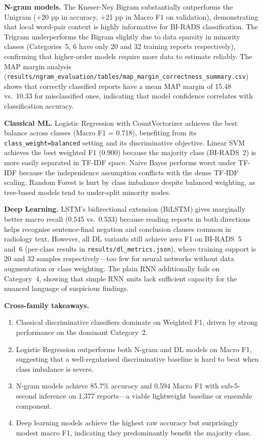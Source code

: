 \documentclass[11pt,a4paper]{article}
\begin{document}
\textbf{N-gram models.}
The Kneser-Ney Bigram substantially outperforms the Unigram ($+$20 pp in
accuracy, $+$21 pp in Macro F1 on validation), demonstrating that local
word-pair context is highly informative for BI-RADS classification.
The Trigram underperforms the Bigram slightly due to data sparsity in minority
classes (Categories~5, 6 have only 20 and 32 training reports respectively),
confirming that higher-order models require more data to estimate reliably.
The MAP margin analysis (\texttt{results/ngram\_evaluation/tables/map\_margin\_correctness\_summary.csv})
shows that correctly classified reports have a mean MAP margin of 15.48
vs.\ 10.33 for misclassified ones, indicating that model confidence correlates
with classification accuracy.

\textbf{Classical ML.}
Logistic Regression with CountVectorizer achieves the best balance across
classes (Macro F1 = 0.718), benefiting from its \texttt{class\_weight=balanced}
setting and its discriminative objective.
Linear SVM achieves the best weighted F1 (0.900) because the majority class
(BI-RADS~2) is more easily separated in TF-IDF space.
Naive Bayes performs worst under TF-IDF because the independence assumption
conflicts with the dense TF-IDF scaling.
Random Forest is hurt by class imbalance despite balanced weighting, as
tree-based models tend to under-split minority nodes.

\textbf{Deep Learning.}
LSTM's bidirectional extension (BiLSTM) gives marginally better macro recall
(0.545 vs.\ 0.533) because reading reports in both directions helps recognise
sentence-final negation and conclusion clauses common in radiology text.
However, all DL variants still achieve zero F1 on BI-RADS~5 and~6 (per-class
results in \texttt{results/dl\_metrics.json}), where training support is 20
and 32 samples respectively---too few for neural networks without data
augmentation or class weighting.
The plain RNN additionally fails on Category~4, showing that simple RNN
units lack sufficient capacity for the nuanced language of suspicious findings.

\textbf{Cross-family takeaways.}
\begin{enumerate}
  \item Classical discriminative classifiers dominate on Weighted F1, driven
        by strong performance on the dominant Category~2.
  \item Logistic Regression outperforms both N-gram and DL models on Macro F1,
        suggesting that a well-regularised discriminative baseline is
        hard to beat when class imbalance is severe.
  \item N-gram models achieve 85.7\% accuracy and 0.594 Macro F1 with
        sub-5-second inference on 1{,}377 reports---a viable lightweight
        baseline or ensemble component.
  \item Deep learning models achieve the highest raw accuracy but surprisingly
        modest macro F1, indicating they predominantly benefit the majority class.
\end{enumerate}
\end{document}
